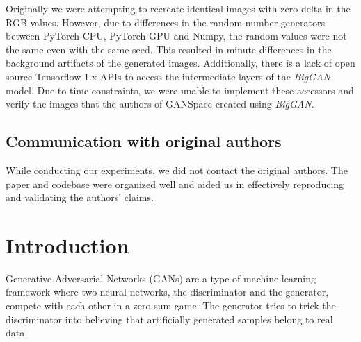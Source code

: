\documentclass{article}
\begin{document}
Originally we were attempting to recreate identical images with zero delta in the RGB values. However, due to differences in the random number generators between PyTorch-CPU, PyTorch-GPU and Numpy, the random values were not the same even with the same seed. This resulted in minute differences in the background artifacts of the generated images. Additionally, there is a lack of open source Tensorflow 1.x APIs to access the intermediate layers of the \textit{BigGAN} model. Due to time constraints, we were unable to implement these accessors and verify the images that the authors of GANSpace created using \textit{BigGAN}.

\subsection*{Communication with original authors}

While conducting our experiments, we did not contact the original authors. The paper and codebase were organized well and aided us in effectively reproducing and validating the authors' claims.

\newpage
\section{Introduction}

Generative Adversarial Networks (GANs) \cite{gan} are a type of machine learning framework where two neural networks, the discriminator and the generator, compete with each other in a zero-sum game. The generator tries to trick the discriminator into believing that artificially generated samples belong to real data.
\end{document}
